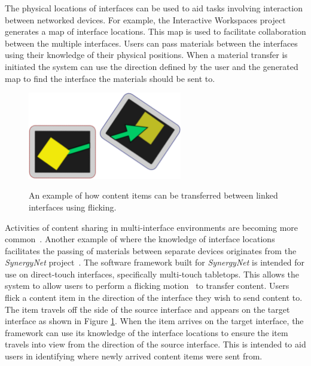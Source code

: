 \documentclass{bmcart}
\begin{document}
The physical locations of interfaces can be used to aid tasks involving interaction between networked devices.
For example, the Interactive Workspaces project~\cite{Johanson2002} generates a map of interface locations.
This map is used to facilitate collaboration between the multiple interfaces.
Users can pass materials between the interfaces using their knowledge of their physical positions.
When a material transfer is initiated the system can use the direction defined by the user and the generated map to find the interface the materials should be sent to.

\begin{figure}[h!]
   \centering
   \caption{An example of how content items can be transferred between linked interfaces using flicking.}
   \includegraphics[width=0.6\textwidth]{figures/flicking.png}
   \label{fig:flick}
\end{figure}

Activities of content sharing in multi-interface environments are becoming more common~\cite{Nacenta2009}.
Another example of where the knowledge of interface locations facilitates the passing of materials between separate devices originates from the {\emph{SynergyNet}} project~\cite{Burd2009}.
The software framework built for {\emph{SynergyNet}} is intended for use on direct-touch interfaces, specifically multi-touch tabletops.
This allows the system to allow users to perform a flicking motion~\cite{Reetz2006} to transfer content.
Users flick a content item in the direction of the interface they wish to send content to.
The item travels off the side of the source interface and appears on the target interface as shown in Figure \ref{fig:flick}.
When the item arrives on the target interface, the framework can use its knowledge of the interface locations to ensure the item travels into view from the direction of the source interface. %
This is intended to aid users in identifying where newly arrived content items were sent from.
\end{document}

